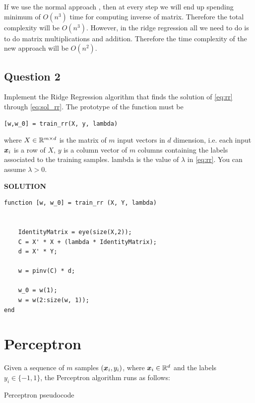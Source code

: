 \documentclass{article}
\begin{document}
\begin{itemize}
\begin{mdframed}[backgroundcolor=lightgray]
If we use the normal approach , then at every step we will end up spending minimum of $O(n^3)$ time for computing inverse of matrix. Therefore the total complexity will be $O(n^3)$. However, in the ridge regression all we need to do is to do matrix multiplications and addition. Therefore the time complexity of the new approach will be $O(n^2)$.
\end{mdframed}
\end{itemize}


\subsection{Question 2}
Implement the Ridge Regression algorithm that finds the solution of \eqref{eq:rr} through \eqref{eq:sol_rr}.
The prototype of the function must be 
\begin{verbatim}
[w,w_0] = train_rr(X, y, lambda)
\end{verbatim}
where $X \in \mathbb{R}^{m \times d}$ is the matrix of $m$ input vectors in $d$ dimension, i.e. each input $\boldsymbol{x}_i$ is a row of $X$, $y$ is a column vector of $m$ columns containing the labels associated to the training samples. lambda is the value of $\lambda$ in \eqref{eq:rr}. You can assume $\lambda>0$.

\textbf{SOLUTION}
\begin{verbatim}
function [w, w_0] = train_rr (X, Y, lambda)

    
    IdentityMatrix = eye(size(X,2));
    C = X' * X + (lambda * IdentityMatrix);
    d = X' * Y;
    
    w = pinv(C) * d;

    w_0 = w(1);
    w = w(2:size(w, 1));
end
\end{verbatim}


\section{Perceptron}

Given a sequence of $m$ samples $(\boldsymbol{x}_i, y_i)$, where $\boldsymbol{x}_i \in \mathbb{R}^d$ and the labels $y_i \in \{-1, 1\}$, the Perceptron algorithm
runs as follows:

\begin{algorithm}
\begin{algorithmic}
\ENDIF
\ENDFOR
\end{algorithmic}
\label{algo:perc}
\caption{Perceptron pseudocode}
\end{algorithm}
\end{document}
